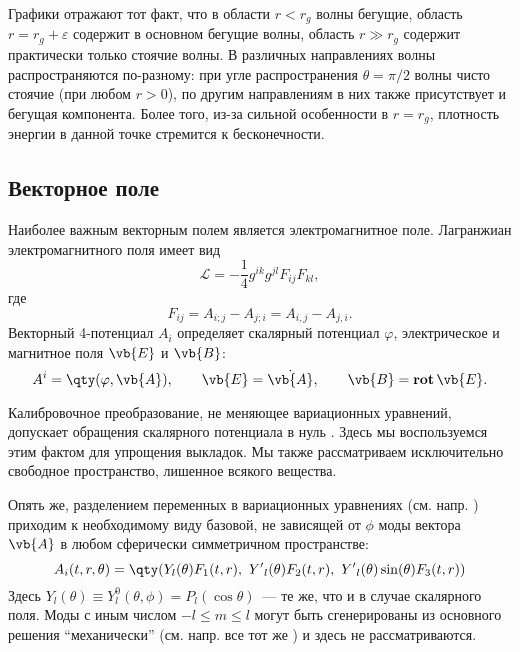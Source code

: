 \documentclass[\docroot/reports/draft/report.tex]{subfiles}
\begin{document}
        Графики отражают тот факт, что в области $r < r_g$ волны бегущие, область $r = r_g + \varepsilon$ содержит в основном бегущие волны, область $r \gg r_g$ содержит практически только стоячие волны. В различных направлениях волны распространяются по-разному: при угле распространения $\theta = \pi/2$ волны чисто стоячие (при любом $r > 0$), по другим направлениям в них также присутствует и бегущая компонента. Более того, из-за сильной особенности в $r = r_g$, плотность энергии в данной точке стремится к бесконечности.

\subsection{Векторное поле}

    Наиболее важным векторным полем является электромагнитное поле. Лагранжиан электромагнитного поля имеет вид \cite{landau_v2}
    \begin{equation}
        \mathcal{L} = - \frac{1}{4} g^{ik} g^{jl} F_{ij} F_{kl} ,
    \end{equation}
    где
    \begin{equation}
        F_{ij} = A_{i;j} - A_{j;i} = A_{i,j} - A_{j,i} .
    \end{equation}
    Векторный 4-потенциал $A_i$ определяет скалярный потенциал $\varphi$, электрическое и магнитное поля $\vb{E}$ и $\vb{B}$:
    \begin{equation}
        A^i = \qty(\varphi, \vb{A}), \qquad
        \vb{E} = \dot{\vb{A}}, \qquad
        \vb{B} = \mathop{\mathbf{rot}}{\vb{E}} .
    \end{equation}

    Калибровочное преобразование, не меняющее вариационных уравнений, допускает обращения скалярного потенциала в нуль \cite{landau_v2}. Здесь мы воспользуемся этим фактом для упрощения выкладок. Мы также рассматриваем исключительно свободное пространство, лишенное всякого вещества.

    Опять же, разделением переменных в вариационных уравнениях (см. напр. \cite{BurVas2019}) приходим к необходимому виду базовой, не зависящей от $\phi$ моды вектора $\vb{A}$ в любом сферически симметричном пространстве:
    \begin{equation}
        A_i(t,r,\theta) = \qty(Y_l(\theta) F_1(t,r),\ {Y'}_l(\theta) F_2(t,r),\ {Y'}_l(\theta) \sin(\theta) F_3(t,r))
    \end{equation}
    Здесь $Y_l(\theta) \equiv Y_l^0(\theta,\phi) = P_l(\cos\theta)$~--- те же, что и в случае скалярного поля. Моды с иным числом $-l \le m \le l$ могут быть сгенерированы из основного решения \enquote{механически} (см. напр. все тот же \cite{BurVas2019}) и здесь не рассматриваются.
\end{document}
